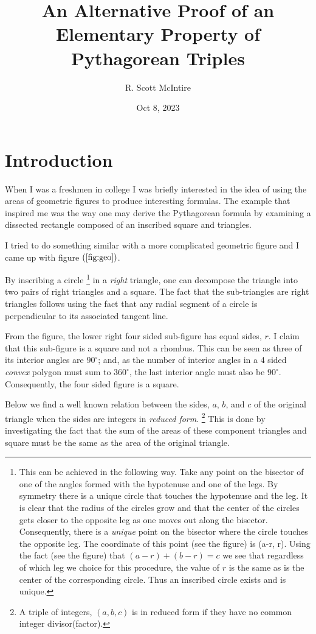 \documentclass[12pt]{article}
\title{An Alternative Proof of an Elementary Property of Pythagorean Triples}
\author{R. Scott McIntire}
\date{Oct 8, 2023}
\begin{document}
\maketitle

\section{Introduction}
When I was a freshmen in college I was briefly interested in the idea of 
using the areas of geometric figures to
produce interesting formulas. The example that inspired me was the way one 
may derive the Pythagorean formula
by examining a dissected rectangle composed of 
an inscribed square and triangles. 

I tried to do something similar with a more complicated geometric figure and 
I came up with figure $(\ref{fig:geo})$.

By inscribing a circle%
\footnote{This can be achieved in the following way.
Take any point on the bisector of one of the angles formed
with the hypotenuse and one of the legs. By symmetry there is a unique circle
that touches the hypotenuse and the leg. It is clear that the radius 
of the circles grow and that the center of the circles gets closer to the
opposite leg as one moves out along the bisector.
Consequently, there is
a {\em unique\/} point on the bisector where the circle touches the opposite leg.
The coordinate of this point (see the figure) is (a-r, r). Using the fact 
(see the figure) that $(a-r) + (b-r) = c$ we see that regardless of 
which leg we choice for this procedure, the value of $r$ is the same as is
the center of the corresponding circle. Thus an inscribed circle exists
and is unique.}
in a {\em right\/} triangle, one can decompose the triangle 
into two pairs of right triangles and a square. The fact that the sub-triangles
are right triangles follows using the fact that 
any radial segment of a circle is perpendicular to its
associated tangent line. 

From the figure, the lower right four sided sub-figure has equal sides, $r$.
I claim that this sub-figure is a square and not a rhombus.
This can be seen as three of its interior angles are 
$90^\circ$; and, as the number of interior angles in a 4 sided {\em convex\/} 
polygon must sum to $360^\circ$, the last interior angle must also be $90^\circ$.
Consequently, the four sided figure is a square.

Below we find a well known relation between the sides, $a$, $b$, and $c$ of the
original triangle when the sides are integers in {\em reduced form\/}.%
\footnote{A triple of integers, $(a, b, c)$ is in reduced form if 
they have no common integer divisor(factor).}
This is done by investigating the fact that the sum of the areas
of these component triangles 
and square must be the same as the area of the original triangle. 
\end{document}
